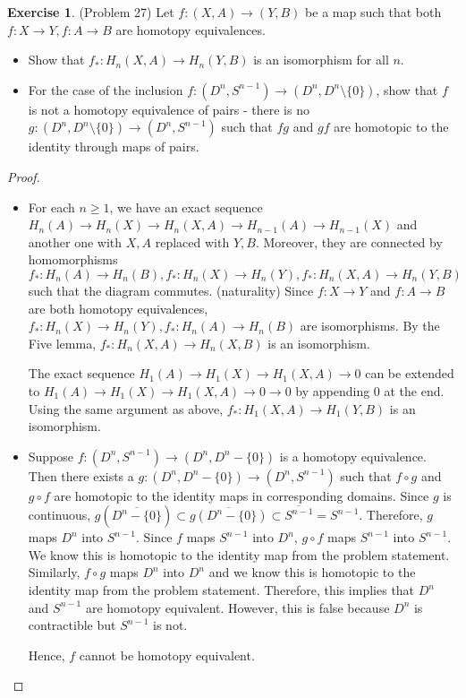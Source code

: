 \documentclass[psamsfonts]{amsart}
\theoremstyle{definition}
\newtheorem*{exer}{Exercise}
\theoremstyle{remark}
\numberwithin{equation}{section}
\begin{document}
\begin{exer}{(Problem 27)}
  Let $f:(X, A) \rightarrow (Y, B)$ be a map such that both $f: X \rightarrow Y, f:A \rightarrow B$ are homotopy equivalences.

  \begin{itemize}
    \item
      Show that $f_* : H_n(X, A) \rightarrow  H_n(Y, B)$ is an isomorphism for all $n$.
    \item
      For the case of the inclusion $f:(D^n, S^{n - 1}) \rightarrow (D^n, D^n \setminus \{ 0 \})$, show that $f$ is not a homotopy equivalence of pairs -
      there is no $g: (D^n, D^n \setminus \{ 0 \}) \rightarrow (D^n, S^{n - 1})$ such that $fg$ and $gf$ are homotopic to the identity through maps of pairs.
  \end{itemize}
\end{exer}

\begin{proof}
  $ $
  \begin{itemize}
    \item
      For each $n \geq 1$, we have an exact sequence $H_n(A) \rightarrow H_n(X) \rightarrow H_n(X, A) \rightarrow H_{n - 1}(A) \rightarrow H_{n - 1}(X)$ and another one with $X, A$ replaced with $Y, B$.
      Moreover, they are connected by homomorphisms $f_*: H_n(A) \rightarrow H_n(B), f_*: H_n(X) \rightarrow H_n(Y), f_*:H_n(X, A) \rightarrow H_n(Y, B)$ such that the diagram commutes. (naturality)
      Since $f: X \rightarrow Y$ and $f: A \rightarrow B$ are both homotopy equivalences, $f_*: H_n(X) \rightarrow H_n(Y), f_*: H_n(A) \rightarrow H_n(B)$ are isomorphisms.
      By the Five lemma, $f_*: H_n(X, A) \rightarrow H_n(X, B)$ is an isomorphism.

      The exact sequence $H_1(A) \rightarrow H_1(X) \rightarrow H_1(X, A) \rightarrow 0$ can be extended to $H_1(A) \rightarrow H_1(X) \rightarrow H_1(X, A) \rightarrow 0 \rightarrow 0$ by appending 0 at the end.
      Using the same argument as above, $f_*: H_1(X, A) \rightarrow H_1(Y, B)$ is an isomorphism.
    \item
      Suppose $f: (D^n, S^{n - 1}) \rightarrow (D^n, D^n - \{ 0 \})$ is a homotopy equivalence.
      Then there exists a $g: (D^n, D^n - \{ 0 \}) \rightarrow (D^n, S^{n - 1})$ such that $f \circ g$ and $g \circ f$ are homotopic to the identity maps in corresponding domains.
      Since $g$ is continuous, $g(\overline{D^n - \{ 0 \}}) \subset \overline{g(D^n - \{ 0 \})} \subset \overline{S^{n - 1}} = S^{n - 1}$.
      Therefore, $g$ maps $D^n$ into $S^{n - 1}$.
      Since $f$ maps $S^{n - 1}$ into $D^n$, $g \circ f$ maps $S^{n - 1}$ into $S^{n - 1}$.
      We know this is homotopic to the identity map from the problem statement.
      Similarly, $f \circ g$ maps $D^n$ into $D^n$ and we know this is homotopic to the identity map from the problem statement.
      Therefore, this implies that $D^n$ and $S^{n - 1}$ are homotopy equivalent.
      However, this is false because $D^n$ is contractible but $S^{n - 1}$ is not.

      Hence, $f$ cannot be homotopy equivalent.
  \end{itemize}

\end{proof}
\end{document}
